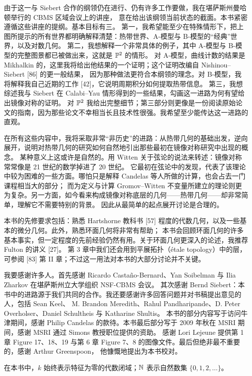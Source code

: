 由于这一与 Siebert 合作的纲领仍在进行、仍有许多工作要做，我在堪萨斯州曼哈顿举行的 CBMS 区域会议上的讲座，
意在给出该纲领当前状态的截面。本书紧密遵循这些讲座的提纲。基本目标有三。
第一，我希望能至少在特殊情形下，把上图所提示的所有世界都明确解释清楚：热带世界、A-模型与 B-模型的“经典”世界，以及对数几何。
第二，我想解释一个非常具体的例子，其中 A-模型与 B-模型的完整图景都已被做出来，这就是 $\mathbb{P}^2$ 的情形。
对 A-模型，曲线计数的结果是 Mikhalkin 的，这里我将给出他结果的一个证明；这个证明改编自 Nishinou--Siebert [86] 的更一般结果，
因为那种做法更符合本纲领的理念。对 B-模型，我将解释我自己近期的工作 [42]，它说明周期积分如何提取热带信息。
第三，我想综述我与 Siebert 在 Calabi--Yau 情形得到的一些结果，勾画这一进路为何有望给出镜像对称的证明。
对 $\mathbb{P}^2$ 我给出完整细节；第三部分则更像是一份阅读原始论文的指南，因为那些论文不幸相当长且技术性很强。我希望至少能传达这一进路的直观。

在所有这些内容中，我将采取非常“非历史”的进路：从热带几何的基础出发，逆向展开，说明对热带几何的研究如何自然地引出那些最初在镜像对称研究中出现的概念。
某种意义上这或许是自然的。用 Witten 关于弦论的说法来转述：镜像对称常常像是 21 世纪的数学掉进了 20 世纪。
它最初在弦论中的发现，代表了该理论中较为困难的一些方面。哪怕只是解释 Candelas 等人所做的计算，也会占去一门课程相当大的部分；
而为定义与计算 Gromov--Witten 不变量所建立的理论则更为复杂。另一方面，如今看来构成镜像对称底层的几何——热带几何——却非常简单，理解它不需要特别的背景。
因此从最简单的起点展开讨论是合理的。

本书的先修要求包括：熟悉 Hartshorne 教科书 [57] 程度的代数几何，以及一些基本的微分几何。此外，熟悉环面几何将非常有帮助；
本书会回顾环面几何的许多基本事实，但一定程度的先前经验仍然有用。关于环面几何更深入的论述，我推荐 Fulton 的讲义 [27]。
第 3 章中我们还会用到平展拓扑（étale topology）中的层，可参阅 [83] 第 II 章；不过这一用法对本书的大部分讨论并不关键。

我要感谢许多人。首先感谢 Ricardo Castaño-Bernard、Yan Soibelman 与 Ilia Zharkov 在堪萨斯州立大学组织 NSF-CBMS 会议。
其次感谢 Bernd Siebert：本书中的进路源于我们共同的合作。我还要感谢许多回答问题并对书稿提出意见的人，包括 Sean Keel、
M. Brandon Meredith、Rahul Pandharipande、D. Peter Overholser、Daniel Schultheis 与 Katharine Shultis。
本书的部分内容写于访问牛津期间，感谢 Philip Candelas 的款待。本书最后部分写于 2009 年秋在 MSRI 期间，感谢 MSRI 通过 Simons 教授职位提供的资助。
感谢 Lori Lejeune 提供第 1 章 Figure 17、18、19 与第 6 章 Figure 7、8 的图像文件。最后但绝非最不重要的，感谢 Arthur Greenspoon，
他慷慨地提出为本书校对。

 在本书中，$k$ 始终表示特征为零的代数闭域；$\mathbb{N}$ 表示自然数集 $\{0,1,2,\dots\}$。

